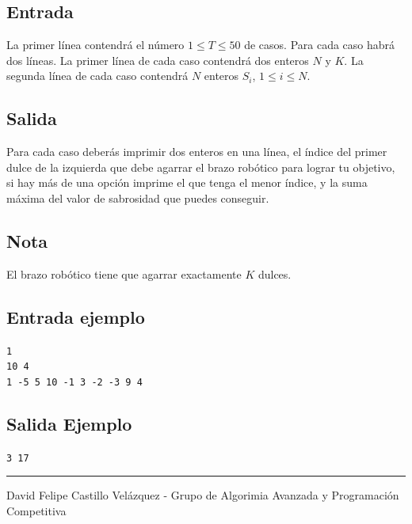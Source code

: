 \documentclass[letter,10pt]{article}
\newcommand{\lyxaddress}[1]{
\par {\raggedright #1
\vspace{1.4em}
\noindent\par}
}
\begin{document}
\subsection*{Entrada}

La primer línea contendrá el número $1 \leq T \leq 50$ de casos. Para cada caso habrá dos líneas. La primer línea de cada caso contendrá dos enteros $N$ y $K$. La segunda línea de cada caso contendrá $N$ enteros $S_i$, $1 \leq i \leq N$.

\subsection*{Salida}

Para cada caso deberás imprimir dos enteros en una línea, el índice del primer dulce de la izquierda que debe agarrar el brazo robótico para lograr tu objetivo, si hay más de una opción imprime el que tenga el menor índice, y la suma máxima del valor de sabrosidad que puedes conseguir.

\subsection*{Nota}

El brazo robótico tiene que agarrar exactamente $K$ dulces.

\subsection*{Entrada ejemplo}
\noindent \texttt{1}~\\
\texttt{10 4}~\\
\texttt{1 -5 5 10 -1 3 -2 -3 9 4}~\\
\noindent 

\subsection*{Salida Ejemplo}

\noindent \texttt{3 17}

\noindent \rule[0.5ex]{1\columnwidth}{1pt}

\lyxaddress{David Felipe Castillo Velázquez - Grupo de Algorimia Avanzada y Programación Competitiva}
\end{document}
